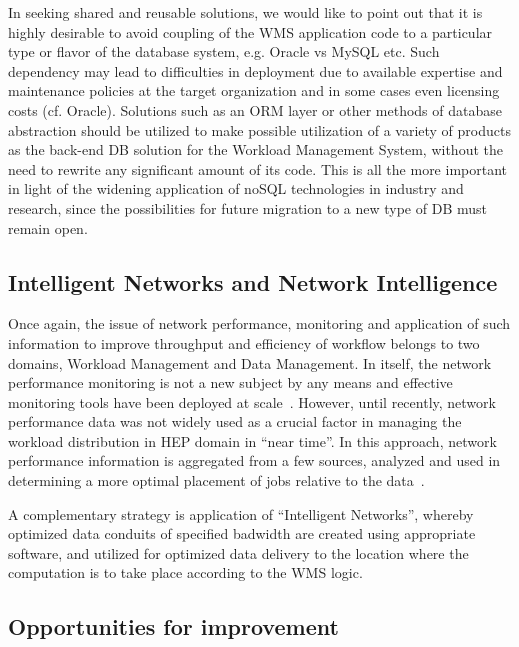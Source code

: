 In seeking shared and reusable solutions, we would like to point out that it is highly desirable to avoid coupling of the WMS application code to a particular
type or flavor of the database system, e.g. Oracle vs MySQL etc. Such dependency may lead to difficulties in deployment due to available
expertise and maintenance policies at the target organization and in some cases even licensing costs (cf. Oracle). Solutions such as an ORM layer
or other methods of database abstraction
should be utilized to make possible utilization of a variety of  products as the back-end DB solution for the Workload Management System,
without the need to rewrite any significant amount of its code. This is all the more important in light of the widening application of noSQL
technologies in industry and research, since the possibilities for future migration to a new type of DB must remain open.


\subsection{Intelligent Networks and Network Intelligence}

Once again, the issue of network performance, monitoring and application of such information to improve throughput and efficiency of workflow
belongs to two domains, Workload Management and Data Management. In itself, the network performance monitoring is not a new subject by any means
and effective monitoring tools have been deployed at scale~\cite{perfsonar_chep12}. However, until recently, network performance data was not
widely used as a crucial factor in managing the workload distribution in HEP domain in ``near time''. In this approach, network performance information
is aggregated from a few sources, analyzed and used in determining a more optimal placement of jobs relative to the data~\cite{panda_chep13}.

A complementary strategy is application of ``Intelligent Networks'', whereby optimized data conduits of specified badwidth are created using
appropriate software, and utilized for optimized data delivery to the location where the computation is to take place according to the WMS logic.



\subsection{Opportunities for improvement}


